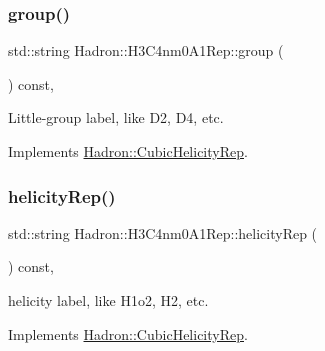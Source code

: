 \mbox{\label{structHadron_1_1H3C4nm0A1Rep_a031edbff97795d7fd225e9a3d70b5d8f}} 
\subsubsection{\texorpdfstring{group()}{group()}\hspace{0.1cm}{\footnotesize\ttfamily [5/5]}}
{\footnotesize\ttfamily std\+::string Hadron\+::\+H3\+C4nm0\+A1\+Rep\+::group (\begin{DoxyParamCaption}{ }\end{DoxyParamCaption}) const\hspace{0.3cm}{\ttfamily [inline]}, {\ttfamily [virtual]}}

Little-\/group label, like D2, D4, etc. 

Implements \mbox{\hyperlink{structHadron_1_1CubicHelicityRep_a101a7d76cd8ccdad0f272db44b766113}{Hadron\+::\+Cubic\+Helicity\+Rep}}.

\mbox{\label{structHadron_1_1H3C4nm0A1Rep_a09ac0cfc6730bea0401124a20d15bb0f}} 
\subsubsection{\texorpdfstring{helicityRep()}{helicityRep()}\hspace{0.1cm}{\footnotesize\ttfamily [1/3]}}
{\footnotesize\ttfamily std\+::string Hadron\+::\+H3\+C4nm0\+A1\+Rep\+::helicity\+Rep (\begin{DoxyParamCaption}{ }\end{DoxyParamCaption}) const\hspace{0.3cm}{\ttfamily [inline]}, {\ttfamily [virtual]}}

helicity label, like H1o2, H2, etc. 

Implements \mbox{\hyperlink{structHadron_1_1CubicHelicityRep_af1096946b7470edf0a55451cc662f231}{Hadron\+::\+Cubic\+Helicity\+Rep}}.

\mbox{\label{structHadron_1_1H3C4nm0A1Rep_a09ac0cfc6730bea0401124a20d15bb0f}} 
